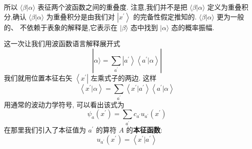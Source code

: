 \documentclass[lang=cn,newtx,10pt,scheme=chinese,thmcnt=section]{elegantbook}
\begin{document}
所以 $\langle \beta | \alpha \rangle$ 表征两个波函数之间的重叠度. 注意,我们并不是把 $\langle \beta | \alpha \rangle$ 定义为重叠积分,确认 $\langle \beta | \alpha \rangle$ 为重叠积分是由我们对 $\left| {x}^{\prime }\right\rangle$ 的完备性假定推知的. $\langle \beta | \alpha \rangle$ 更为一般的、 不依赖于表象的解释是,它表示在 $|\beta \rangle$ 态中找到 $|\alpha \rangle$ 态的概率振幅.

这一次让我们用波函数语言解释展开式
\begin{equation}
	| {\alpha \rangle = \mathop{\sum }\limits_{{a}^{\prime }}\left| {a}^{\prime }\right\rangle \left\langle {{a}^{\prime } | \alpha }\right\rangle }|
\end{equation}
我们就用位置本征右矢 $\left\langle {x}^{\prime }\right|$ 左乘式子的两边. 这样
\begin{equation}
	\left\langle {{x}^{\prime } | \alpha }\right\rangle = \mathop{\sum }\limits_{{a}^{\prime }}\left\langle {{x}^{\prime } | {a}^{\prime }}\right\rangle \left\langle {{a}^{\prime } | \alpha }\right\rangle
\end{equation}
用通常的波动力学符号, 可以看出该式为
\begin{equation}
	{\psi }_{a}\left( {x}^{\prime }\right) = \mathop{\sum }\limits_{{a}^{\prime }}{c}_{{a}^{\prime }}{u}_{{a}^{\prime }}\left( {x}^{\prime }\right)
\end{equation}
在那里我们引入了本征值为 ${a}^{\prime }$ 的算符 $A$ 的\textbf{本征函数}:
\begin{equation}
	{u}_{{a}^{\prime }}\left( {x}^{\prime }\right) = \left\langle {{x}^{\prime } | {a}^{\prime }}\right\rangle
\end{equation}
\end{document}
